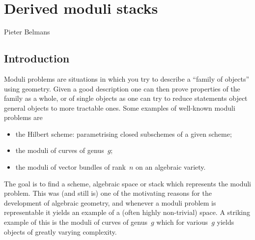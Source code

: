 \chapter{Derived moduli stacks}
\begin{flushright}
  Pieter Belmans
\end{flushright}

\begin{refsection}

\section{Introduction}
Moduli problems are situations in which you try to describe a ``family of objects'' using geometry. Given a good description one can then prove properties of the family as a whole, or of single objects as one can try to reduce statements object general objects to more tractable ones. Some examples of well-known moduli problems are
\begin{itemize}
  \item the Hilbert scheme: parametrising closed subschemes of a given scheme;
  \item the moduli of curves of genus~$g$;
  \item the moduli of vector bundles of rank~$n$ on an algebraic variety.
\end{itemize}
The goal is to find a scheme, algebraic space or stack which represents the moduli problem. This was (and still is) one of the motivating reasons for the development of algebraic geometry, and whenever a moduli problem is representable it yields an example of a (often highly non-trivial) space. A striking example of this is the moduli of curves of genus~$g$ which for various~$g$ yields objects of greatly varying complexity.


\end{refsection}
